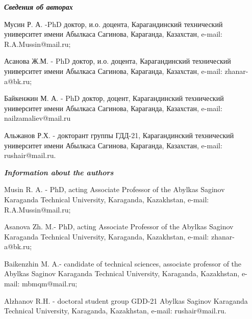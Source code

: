 \emph{{\bfseries Сведения об авторах}}

\begin{noparindent}
Мусин Р. А. -PhD доктор, и.о. доцента, Карагандинский технический
университет имени Абылкаса Сагинова, Караганда, Казахстан, e-mail:
R.A.Mussin@mail.ru;

Асанова Ж.М. - PhD доктор, и.о. доцента, Карагандинский технический
университет имени Абылкаса Сагинова, Караганда, Казахстан, e-mail:
zhanar-a@bk.ru;

Байкенжин М. А. - PhD доктор, доцент, Карагандинский технический
университет имени Абылкаса Сагинова, Караганда, Казахстан, e-mail:
nailzamaliev@mail.ru

Альжанов Р.Х. - докторант группы ГДД-21, Карагандинский технический
университет имени Абылкаса Сагинова, Караганда, Казахстан, e-mail:
rushair@mail.ru.
\end{noparindent}

\emph{{\bfseries Information about the authors}}

\begin{noparindent}
Musin R. A. - PhD, acting Associate Professor of the Abylkas Saginov
Karaganda Technical University, Karaganda, Kazakhstan, e-mail:
R.A.Mussin@mail.ru;

Asanova Zh. M.- PhD, acting Associate Professor of the Abylkas Saginov
Karaganda Technical University, Karaganda, Kazakhstan, e-mail:
zhanar-a@bk.ru;

Baikenzhin M. A.- candidate of technical sciences, associate professor
of the Abylkas Saginov Karaganda Technical University, Karaganda,
Kazakhstan, e-mail: mbmqm@mail.ru;

Alzhanov R.H. - doctoral student group GDD-21 Abylkas Saginov Karaganda
Technical University, Karaganda, Kazakhstan, e-mail: rushair@mail.ru.
\end{noparindent}
